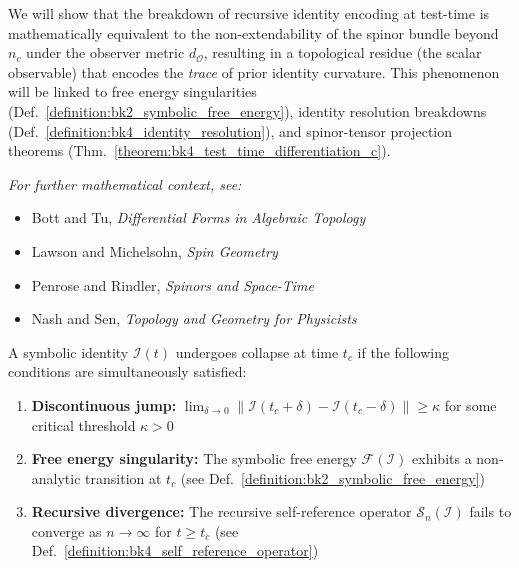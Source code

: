 We will show that the breakdown of recursive identity encoding at test-time is mathematically equivalent to the non-extendability of the spinor bundle beyond $n_c$ under the observer metric $d_\mathcal{O}$, resulting in a topological residue (the scalar observable) that encodes the \emph{trace} of prior identity curvature. This phenomenon will be linked to free energy singularities (Def.~\ref{definition:bk2_symbolic_free_energy}), identity resolution breakdowns (Def.~\ref{definition:bk4_identity_resolution}), and spinor-tensor projection theorems (Thm.~\ref{theorem:bk4_test_time_differentiation_c}).

\vspace{1em}

\textit{For further mathematical context, see:}

\begin{itemize}
    \item Bott and Tu, \textit{Differential Forms in Algebraic Topology} \cite{bott1982differential}
    \item Lawson and Michelsohn, \textit{Spin Geometry} \cite{lawson1989spin}
    \item Penrose and Rindler, \textit{Spinors and Space-Time} \cite{penrose1984spinors}
    \item Nash and Sen, \textit{Topology and Geometry for Physicists} \cite{nash1983topology}
\end{itemize}

\begin{definition}
\label{definition:bk4_collapse_of_symbolic_ide}
A symbolic identity $\mathcal{I}(t)$ undergoes collapse at time $t_c$ if the following conditions are simultaneously satisfied:
\begin{enumerate}
    \item \textbf{Discontinuous jump:} $\lim_{\delta \to 0} \|\mathcal{I}(t_c + \delta) - \mathcal{I}(t_c - \delta)\| \geq \kappa$ for some critical threshold $\kappa > 0$
    \item \textbf{Free energy singularity:} The symbolic free energy $\mathcal{F}(\mathcal{I})$ exhibits a non-analytic transition at $t_c$ (see Def.~\ref{definition:bk2_symbolic_free_energy})
    \item \textbf{Recursive divergence:} The recursive self-reference operator $\mathcal{S}_n(\mathcal{I})$ fails to converge as $n \to \infty$ for $t \geq t_c$ (see Def.~\ref{definition:bk4_self_reference_operator})
\end{enumerate}
\end{definition}


